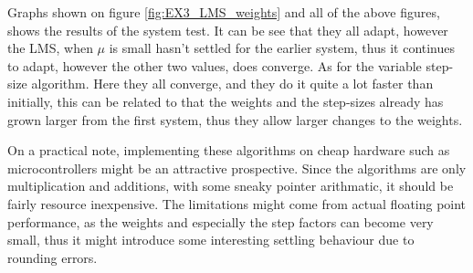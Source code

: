 Graphs shown on figure \ref{fig:EX3_LMS_weights} and all of the above figures, shows the results
of the system test. It can be see that they all adapt, however the LMS, when $\mu$ is small
hasn't settled for the earlier system, thus it continues to adapt, however the other two values, 
does converge. As for the variable step-size algorithm. Here they all converge, and they do it
quite a lot faster than initially, this can be related to that the weights and the step-sizes
already has grown larger from the first system, thus they allow larger changes to the weights.

On a practical note, implementing these algorithms on cheap hardware such as microcontrollers
might be an attractive prospective. Since the algorithms are only multiplication and additions,
with some sneaky pointer arithmatic, it should be fairly resource inexpensive. The limitations 
might come from actual floating point performance, as the weights and especially the step factors 
can become very small, thus it might introduce some interesting settling behaviour due to rounding errors.








